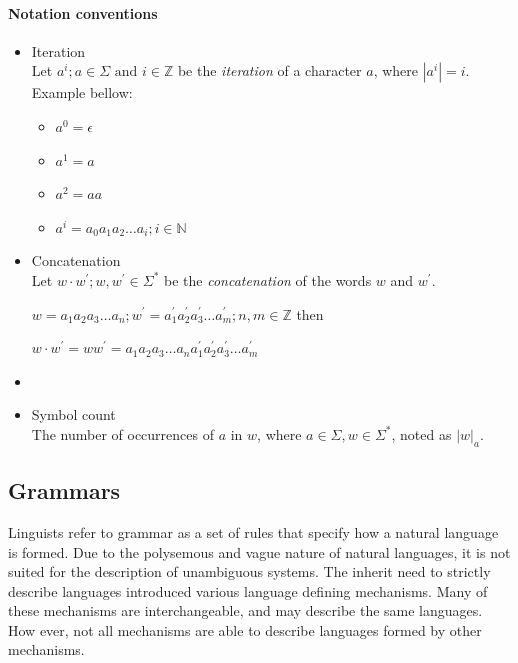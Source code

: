 \paragraph*{Notation conventions}



\begin{itemize}
\item Iteration\\
  Let $a^i; a \in \Sigma \text{ and } i \in \mathbb{Z}$ be the \emph{iteration} of a character $a$, where $|a^i| = i$.\\
Example bellow:


\begin{itemize}
\item $a^0 = \epsilon$
\item $a^1 = a$
\item $a^2 = aa$
\item $a^i = a_0 a_1 a_2 \dots a_i; i \in \mathbb{N}$
\end{itemize}



\item Concatenation\\
  Let $w \cdot w^{'}; w, w^{'} \in \Sigma^{*}$ be the \emph{concatenation} of the words $w$ and $w^{'}$.

$w = a_1 a_2 a_3 \dots a_n ; w^{'} = a^{'}_1 a^{'}_2 a^{'}_3 \dots a^{'}_m; n,m \in \mathbb{Z}$ then  

$w\cdot w^{'} = w w^{'} = a_1 a_2 a_3 \dots a_n a^{'}_1 a^{'}_2 a^{'}_3 \dots a^{'}_m$


\item {}
\item Symbol count\\
The number of occurrences of $a$ in $w$, where $a \in \Sigma, w \in \Sigma^{*}$, noted as $|w|_{a}$.

\end{itemize}

\subsection{Grammars}
Linguists refer to grammar as a set of rules that specify how a natural language is formed. Due to the polysemous and vague nature of natural languages, it is not suited for the description of unambiguous systems. The inherit need to strictly describe languages introduced various language defining mechanisms. Many of these mechanisms are interchangeable, and may describe the same languages. How ever, not all mechanisms are able to describe languages formed by other mechanisms.

